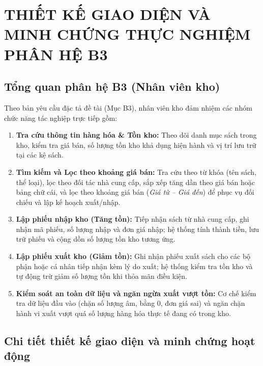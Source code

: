 \documentclass[12pt,a4paper]{article}
\begin{document}
\newpage
\section{THIẾT KẾ GIAO DIỆN VÀ MINH CHỨNG THỰC NGHIỆM PHÂN HỆ B3}
\label{sec:giao-dien-b3}

\subsection{Tổng quan phân hệ B3 (Nhân viên kho)}
\label{subsec:tong-quan-b3}
Theo bản yêu cầu đặc tả đề tài (Mục B3), nhân viên kho đảm nhiệm các nhóm chức năng tác nghiệp trực tiếp gồm:
\begin{enumerate}
    \item \textbf{Tra cứu thông tin hàng hóa \& Tồn kho:} Theo dõi danh mục sách trong kho, kiểm tra giá bán, số lượng tồn kho khả dụng hiện hành và vị trí lưu trữ tại các kệ sách.
    \item \textbf{Tìm kiếm và Lọc theo khoảng giá bán:} Tra cứu theo từ khóa (tên sách, thể loại), lọc theo đối tác nhà cung cấp, sắp xếp tăng dần theo giá bán hoặc bảng chữ cái, và lọc theo khoảng giá bán (\textit{Giá từ -- Giá đến}) để phục vụ đối chiếu và lập kế hoạch xuất/nhập.
    \item \textbf{Lập phiếu nhập kho (Tăng tồn):} Tiếp nhận sách từ nhà cung cấp, ghi nhận mã phiếu, số lượng nhập và đơn giá nhập; hệ thống tính thành tiền, lưu trữ phiếu và cộng dồn số lượng tồn kho tương ứng.
    \item \textbf{Lập phiếu xuất kho (Giảm tồn):} Ghi nhận phiếu xuất sách cho các bộ phận hoặc cá nhân tiếp nhận kèm lý do xuất; hệ thống kiểm tra tồn kho và tự động trừ giảm số lượng tồn khi thỏa mãn điều kiện.
    \item \textbf{Kiểm soát an toàn dữ liệu và ngăn ngừa xuất vượt tồn:} Cơ chế kiểm tra dữ liệu đầu vào (chặn số lượng âm, bằng 0, đơn giá sai) và ngăn chặn hành vi xuất vượt quá số lượng hàng hóa thực tế đang có trong kho.
\end{enumerate}

\subsection{Chi tiết thiết kế giao diện và minh chứng hoạt động}
\label{subsec:minh-chung-b3}
\end{document}
